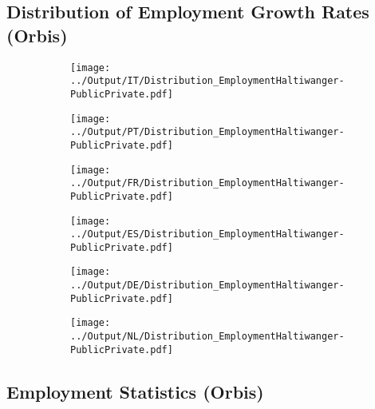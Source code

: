 \documentclass[12pt,notitlepage]{article}
\begin{document}
\subsection{Distribution of Employment Growth Rates (Orbis)}
\begin{figure}[!htpb]
\centering
\begin{subfigure}{.49\textwidth}
    \centering
 \texttt{[image: ../Output/IT/Distribution\_EmploymentHaltiwanger-PublicPrivate.pdf]}
\end{subfigure}%
\begin{subfigure}{.49\textwidth}
    \centering
 \texttt{[image: ../Output/PT/Distribution\_EmploymentHaltiwanger-PublicPrivate.pdf]}
\end{subfigure}
\begin{subfigure}{.49\textwidth}
    \centering
 \texttt{[image: ../Output/FR/Distribution\_EmploymentHaltiwanger-PublicPrivate.pdf]}
\end{subfigure}%
\begin{subfigure}{.49\textwidth}
    \centering
 \texttt{[image: ../Output/ES/Distribution\_EmploymentHaltiwanger-PublicPrivate.pdf]}
\end{subfigure}
\begin{subfigure}{.49\textwidth}
    \centering
 \texttt{[image: ../Output/DE/Distribution\_EmploymentHaltiwanger-PublicPrivate.pdf]}
\end{subfigure}
\begin{subfigure}{.49\textwidth}
    \centering
 \texttt{[image: ../Output/NL/Distribution\_EmploymentHaltiwanger-PublicPrivate.pdf]}
\end{subfigure}
\end{figure}



\subsection{Employment Statistics (Orbis)}
\begin{table}[!htpb]
    \centering
\end{table}
\clearpage
\end{document}
